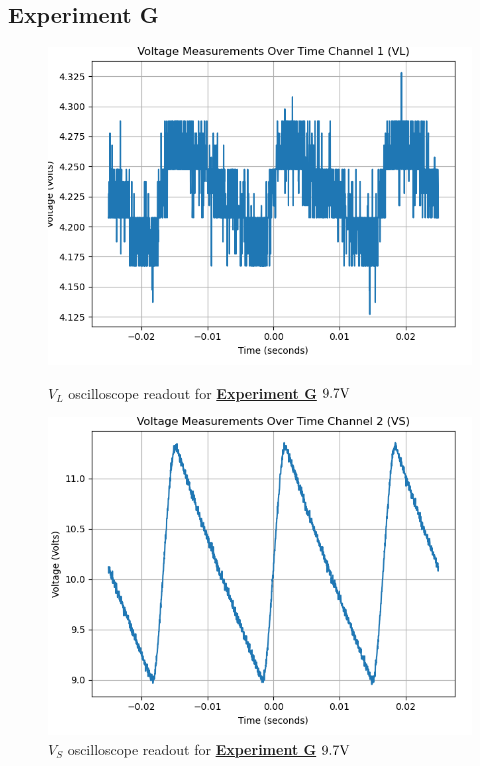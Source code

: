 \documentclass[
	letterpaper
	12pt
]{template}
\newcommand{\bref}[2]{\textbf{\hyperref[#1]{#2}}}
\begin{document}
\subsection{Experiment G}

\begin{figure}[H]\label{data::G}
	\centering
	\begin{minipage}[c]{0.45\textwidth}
		\centering
		\includegraphics[width=\textwidth]{figures/G/1--ch1.png}
	    \caption{$V_{L}$ oscilloscope readout for \bref{exp::G}{Experiment G} $9.7\unit V$ }
	\end{minipage}
	\hfill
	\begin{minipage}[c]{0.45\textwidth}
		\centering
		\includegraphics[width=\textwidth]{figures/G/1--ch2.png}
	    \caption{$V_{S}$ oscilloscope readout for \bref{exp::G}{Experiment G} $9.7\unit V$ }
	\end{minipage}
\end{figure}
\end{document}
